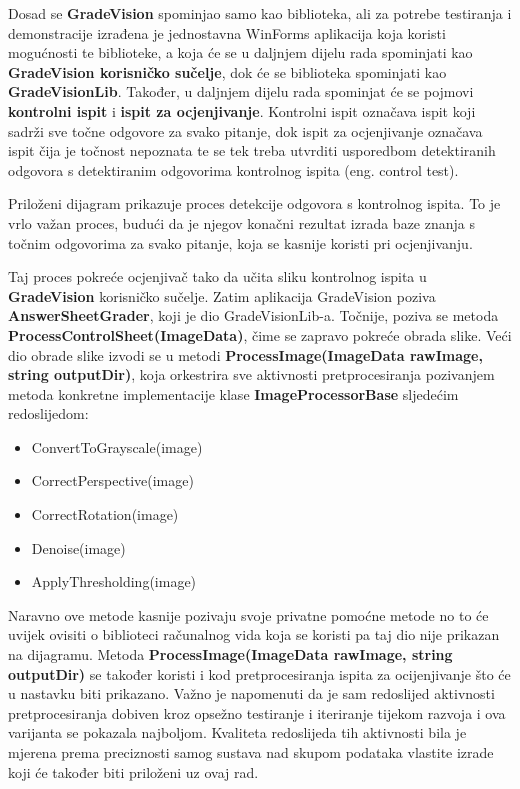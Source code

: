\documentclass{foi}
\begin{document}
Dosad se \textbf{GradeVision} spominjao samo kao biblioteka, ali za potrebe testiranja i demonstracije izrađena je jednostavna WinForms aplikacija koja koristi mogućnosti te biblioteke, a koja će se u daljnjem dijelu rada spominjati kao \textbf{GradeVision korisničko sučelje}, dok će se biblioteka spominjati kao \textbf{GradeVisionLib}. Također, u daljnjem dijelu rada spominjat će se pojmovi \textbf{kontrolni ispit} i \textbf{ispit za ocjenjivanje}. Kontrolni ispit označava ispit koji sadrži sve točne odgovore za svako pitanje, dok ispit za ocjenjivanje označava ispit čija je točnost nepoznata te se tek treba utvrditi usporedbom detektiranih odgovora s detektiranim odgovorima kontrolnog ispita (eng. control test).

Priloženi dijagram prikazuje proces detekcije odgovora s kontrolnog ispita. To je vrlo važan proces, budući da je njegov konačni rezultat izrada baze znanja s točnim odgovorima za svako pitanje, koja se kasnije koristi pri ocjenjivanju.

Taj proces pokreće ocjenjivač  tako da učita sliku kontrolnog ispita u \textbf{GradeVision} korisničko sučelje. Zatim aplikacija GradeVision poziva \textbf{AnswerSheetGrader}, koji je dio GradeVisionLib-a. Točnije, poziva se metoda \textbf{ProcessControlSheet(ImageData)}, čime se zapravo pokreće obrada slike. Veći dio obrade slike izvodi se u metodi \textbf{ProcessImage(ImageData rawImage, string outputDir)}, koja orkestrira sve aktivnosti pretprocesiranja pozivanjem metoda konkretne implementacije klase \textbf{ImageProcessorBase} sljedećim redoslijedom:

\begin{itemize}
\item ConvertToGrayscale(image)
\item CorrectPerspective(image)
\item CorrectRotation(image)
\item Denoise(image)
\item ApplyThresholding(image)
\end{itemize}

Naravno ove metode kasnije pozivaju svoje privatne pomoćne metode no to će uvijek ovisiti o biblioteci računalnog vida koja se koristi pa taj dio nije prikazan na dijagramu. Metoda \textbf{ProcessImage(ImageData rawImage, string outputDir)} se također koristi i kod pretprocesiranja ispita za ocijenjivanje što će u nastavku biti prikazano. Važno je napomenuti da je sam  redoslijed aktivnosti pretprocesiranja dobiven kroz opsežno testiranje i iteriranje tijekom razvoja i ova varijanta se pokazala najboljom. Kvaliteta redoslijeda tih aktivnosti bila je mjerena prema preciznosti samog sustava nad skupom podataka vlastite izrade koji će također biti priloženi uz ovaj rad.
\end{document}
